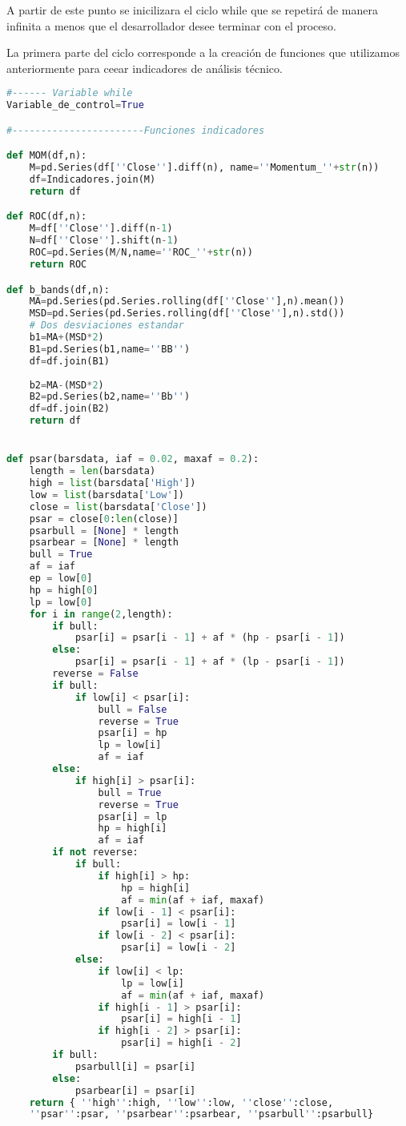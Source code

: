 \documentclass[letterpaper,12pt,oneside]{book}
\begin{document}
A partir de este punto se inicilizara el ciclo while que se repetirá de manera infinita a menos que el desarrollador desee terminar con el proceso.

La primera parte del ciclo corresponde a la creación de funciones que utilizamos anteriormente para ceear indicadores de análisis técnico.



\begin{lstlisting}[language=Python]
#------ Variable while
Variable_de_control=True

#-----------------------Funciones indicadores

def MOM(df,n):
    M=pd.Series(df[''Close''].diff(n), name=''Momentum_''+str(n))
    df=Indicadores.join(M)
    return df

def ROC(df,n):
    M=df[''Close''].diff(n-1)
    N=df[''Close''].shift(n-1)
    ROC=pd.Series(M/N,name=''ROC_''+str(n))
    return ROC

def b_bands(df,n):
    MA=pd.Series(pd.Series.rolling(df[''Close''],n).mean())
    MSD=pd.Series(pd.Series.rolling(df[''Close''],n).std())
    # Dos desviaciones estandar
    b1=MA+(MSD*2)
    B1=pd.Series(b1,name=''BB'')
    df=df.join(B1)
    
    b2=MA-(MSD*2)
    B2=pd.Series(b2,name=''Bb'')
    df=df.join(B2)
    return df


def psar(barsdata, iaf = 0.02, maxaf = 0.2):
    length = len(barsdata)
    high = list(barsdata['High'])
    low = list(barsdata['Low'])
    close = list(barsdata['Close'])
    psar = close[0:len(close)]
    psarbull = [None] * length
    psarbear = [None] * length
    bull = True
    af = iaf
    ep = low[0]
    hp = high[0]
    lp = low[0]
    for i in range(2,length):
        if bull:
            psar[i] = psar[i - 1] + af * (hp - psar[i - 1])
        else:
            psar[i] = psar[i - 1] + af * (lp - psar[i - 1])
        reverse = False
        if bull:
            if low[i] < psar[i]:
                bull = False
                reverse = True
                psar[i] = hp
                lp = low[i]
                af = iaf
        else:
            if high[i] > psar[i]:
                bull = True
                reverse = True
                psar[i] = lp
                hp = high[i]
                af = iaf
        if not reverse:
            if bull:
                if high[i] > hp:
                    hp = high[i]
                    af = min(af + iaf, maxaf)
                if low[i - 1] < psar[i]:
                    psar[i] = low[i - 1]
                if low[i - 2] < psar[i]:
                    psar[i] = low[i - 2]
            else:
                if low[i] < lp:
                    lp = low[i]
                    af = min(af + iaf, maxaf)
                if high[i - 1] > psar[i]:
                    psar[i] = high[i - 1]
                if high[i - 2] > psar[i]:
                    psar[i] = high[i - 2]
        if bull:
            psarbull[i] = psar[i]
        else:
            psarbear[i] = psar[i]
    return { ''high'':high, ''low'':low, ''close'':close, 
    ''psar'':psar, ''psarbear'':psarbear, ''psarbull'':psarbull}



\end{lstlisting}
\end{document}
